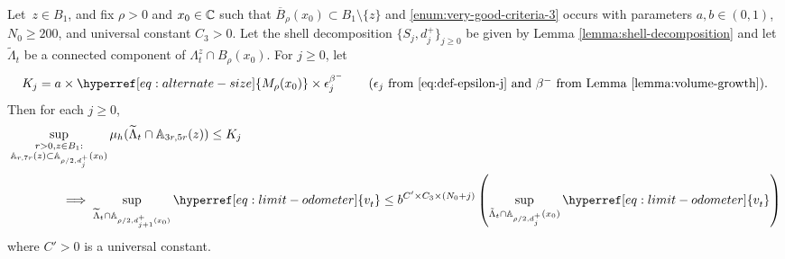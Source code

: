 \documentclass[12pt]{amsart}
\numberwithin{equation}{section}
\newcommand{\cluster}[2]{\hyperref[eq:non-co-set]{\mathit{\Lambda}^{#1}_{#2}}}
\newcommand{\odometer}[2]{\hyperref[eq:limit-odometer]{v^{#1}_{#2}}}
\newcommand{\Mrho}[2]{\hyperref[eq:alternate-size]{M_{#1}(#2)}}
\begin{document}
	\begin{lemma} \label{lemma:low-mass-implies-small-odometer}
		Let~$z \in B_1$, and fix $\rho>0$ and $x_0\in\mathbb{C}$ such that $\overline B_\rho(x_0)\subset B_1\setminus\{z\}$ and \ref{enum:very-good-criteria-3} occurs
		with parameters $a,b \in (0,1)$, $N_0 \geq 200$, and universal constant $C_3 > 0$. Let the shell decomposition $\{S_j, d^+_j\}_{j \geq 0}$ be given by Lemma \ref{lemma:shell-decomposition} and let $\widetilde \Lambda_t$ be a connected component of ${\cluster{z}{t}} \cap B_{\rho}(x_0)$. 
		For $j\geq 0$, let
		\begin{equation} \label{eq:k-j-parameter}
		K_j = a \times \Mrho{\rho}{x_0} \times \epsilon^{\beta^-}_j \qquad \mbox{($\epsilon_j$ from \eqref{eq:def-epsilon-j} and $\beta^-$ from Lemma \ref{lemma:volume-growth})} .
		\end{equation}
		Then for each $j\geq 0$,
		\begin{align} \label{eq:low-mass-small-odometer}
		& \sup_{\substack{r > 0 , z \in B_1 : \\ \A_{r, 7r}(z) \subset \A_{\rho/2, d^+_j}(x_0)}}  \mu_h(\widetilde \Lambda_t \cap \A_{3r, 5r}(z)) \leq K_j \notag \\
		&\qquad\qquad \implies 
		\sup_{\widetilde \Lambda_t \cap \A_{\rho/2, d^+_{j+1}(x_0)}} \odometer{}{t}  \leq  b^{C' \times C_3 \times (N_0 + j)}  \left( \sup_{\tilde \Lambda_t \cap \A_{\rho/2, d^+_j}(x_0)} \odometer{}{t} \right)
		\end{align}
		where $C' > 0$ is a universal constant.
	\end{lemma} 
\end{document}
